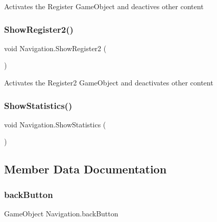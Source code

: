 Activates the Register Game\+Object and deactives other content 

\mbox{\label{classNavigation_a49064344a70692035504796c4acb4e55}} 
\subsubsection{\texorpdfstring{Show\+Register2()}{ShowRegister2()}}
{\footnotesize\ttfamily void Navigation.\+Show\+Register2 (\begin{DoxyParamCaption}{ }\end{DoxyParamCaption})\hspace{0.3cm}{\ttfamily [inline]}}



Activates the Register2 Game\+Object and deactivates other content 

\mbox{\label{classNavigation_ad0b71ff144ebad450751c0493a7b4fba}} 
\subsubsection{\texorpdfstring{Show\+Statistics()}{ShowStatistics()}}
{\footnotesize\ttfamily void Navigation.\+Show\+Statistics (\begin{DoxyParamCaption}{ }\end{DoxyParamCaption})\hspace{0.3cm}{\ttfamily [inline]}}



\subsection{Member Data Documentation}
\mbox{\label{classNavigation_a0ee38b7f1ef62389b7e86d4a2b0b3b50}} 
\subsubsection{\texorpdfstring{back\+Button}{backButton}}
{\footnotesize\ttfamily Game\+Object Navigation.\+back\+Button}

